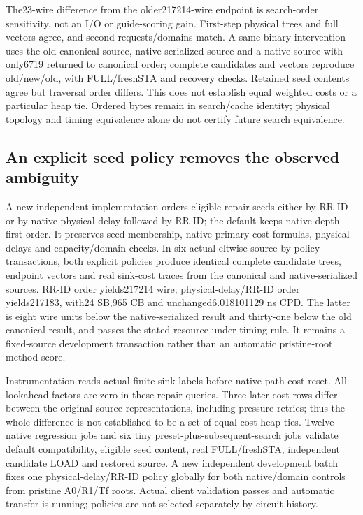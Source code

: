 \documentclass[conference,10pt]{IEEEtran}
\begin{document}
The23-wire difference from the older217214-wire endpoint is search-order sensitivity, not an I/O or guide-scoring gain. First-step physical trees and full vectors agree, and second requests/domains match. A same-binary intervention uses the old canonical source, native-serialized source and a native source with only6719 returned to canonical order; complete candidates and vectors reproduce old/new/old, with FULL/freshSTA and recovery checks. Retained seed contents agree but traversal order differs. This does not establish equal weighted costs or a particular heap tie. Ordered bytes remain in search/cache identity; physical topology and timing equivalence alone do not certify future search equivalence.

\subsection{An explicit seed policy removes the observed ambiguity}
A new independent implementation orders eligible repair seeds either by RR ID or by native physical delay followed by RR ID; the default keeps native depth-first order. It preserves seed membership, native primary cost formulas, physical delays and capacity/domain checks. In six actual eltwise source-by-policy transactions, both explicit policies produce identical complete candidate trees, endpoint vectors and real sink-cost traces from the canonical and native-serialized sources. RR-ID order yields217214 wire; physical-delay/RR-ID order yields217183, with24 SB,965 CB and unchanged6.018101129 ns CPD. The latter is eight wire units below the native-serialized result and thirty-one below the old canonical result, and passes the stated resource-under-timing rule. It remains a fixed-source development transaction rather than an automatic pristine-root method score.

Instrumentation reads actual finite sink labels before native path-cost reset. All lookahead factors are zero in these repair queries. Three later cost rows differ between the original source representations, including pressure retries; thus the whole difference is not established to be a set of equal-cost heap ties. Twelve native regression jobs and six tiny preset-plus-subsequent-search jobs validate default compatibility, eligible seed content, real FULL/freshSTA, independent candidate LOAD and restored source. A new independent development batch fixes one physical-delay/RR-ID policy globally for both native/domain controls from pristine A0/R1/Tf roots. Actual client validation passes and automatic transfer is running; policies are not selected separately by circuit history.
\end{document}
